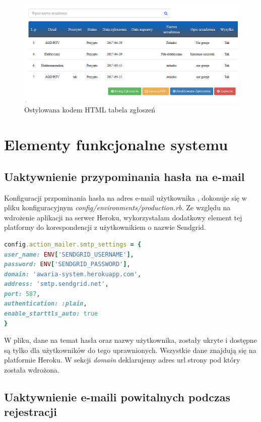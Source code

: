 \documentclass[openright]{xmgr}
\begin{document}
	\begin{figure}[!tbh]
		\centering
		\includegraphics[width=\linewidth]{image/table2}
		\caption{Ostylowana kodem HTML tabela zgłoszeń}
	\end{figure}
	
	\chapter{Elementy funkcjonalne systemu}
	
	\section{Uaktywnienie przypominania hasła na e-mail}
	
	Konfiguracji przpominania hasła na adres e-mail użytkownika \cite{configuration}, dokonuje się w pliku konfiguracyjnym \textit{config/environments/production.rb.} Ze względu na wdrożenie aplikacji na serwer Heroku, wykorzystałam dodatkowy element tej platformy do korespondencji z użytkownikiem o nazwie Sendgrid.  
	
	\begin{lstlisting}[language=Ruby,lineskip={-1pt},caption=Konfiguracja pliku \textit{production.rb}]
config.action_mailer.smtp_settings = {
user_name: ENV['SENDGRID_USERNAME'],
password: ENV['SENDGRID_PASSWORD'],
domain: 'awaria-system.herokuapp.com',
address: 'smtp.sendgrid.net',
port: 587,
authentication: :plain,
enable_starttls_auto: true
}
	\end{lstlisting}
	
	W pliku, dane na temat hasła oraz nazwy użytkownika, zostały ukryte i dostępne są tylko dla użytkowników do tego uprawnionych. Wszystkie dane znajdują się na platformie Heroku. W sekcji \textit{domain} deklarujemy adres url strony pod który została wdrożona.
	\newpage
	\section{Uaktywnienie e-maili powitalnych podczas rejestracji}
	
\end{document}

